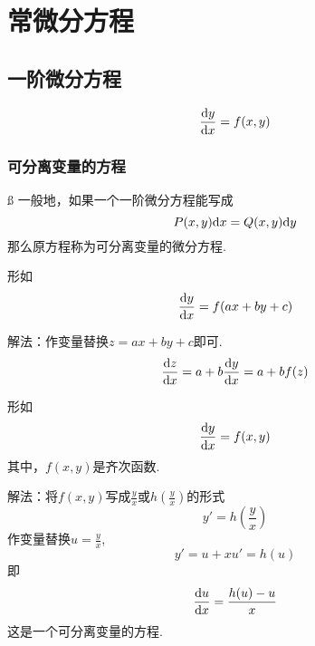 \chapter{常微分方程}
\section{一阶微分方程}
\sj
\begin{equation}
	\frac{{\rm{d}} y}{{\rm{d}} x}=f(x,y)
\end{equation} 
\subsection{可分离变量的方程}ß
一般地，如果一个一阶微分方程能写成
\begin{equation}
	P(x,y){\rm{d}} x=Q(x,y) {\rm{d}} y
\end{equation}
那么原方程称为可分离变量的微分方程.

\example[可分离变量的方程1]
形如
\begin{equation}
	\frac{{\rm{d}} y}{{\rm{d}} x}=f(ax+by+c)
\end{equation}
\par 解法：作变量替换$z=ax+by+c$即可.
\begin{equation}
	\frac{{\rm{d}} z}{{\rm{d}} x}=a+b\frac{{\rm{d}} y}{{\rm{d}} x}=a+bf(z)
\end{equation}

\example[可分离变量的方程2]
形如
\begin{equation}
	\frac{{\rm{d}} y}{{\rm{d}} x}=f(x,y)
\end{equation}
其中，$f(x,y)$是齐次函数.
\par 解法：将$f(x,y)$写成$\displaystyle \frac{y}{x}$或$\displaystyle h\left( \frac{y}{x}\right) $的形式
\begin{equation}
	y'=h(\frac{y}{x})
\end{equation}
作变量替换$\displaystyle u=\frac{y}{x}$,
\begin{equation}
	y'=u+xu'=h(u)
\end{equation}
即
\begin{equation}
	\frac{{\rm{d}} u}{{\rm{d}} x}=\frac{h(u)-u}{x}
\end{equation}
这是一个可分离变量的方程.
\newpage 

